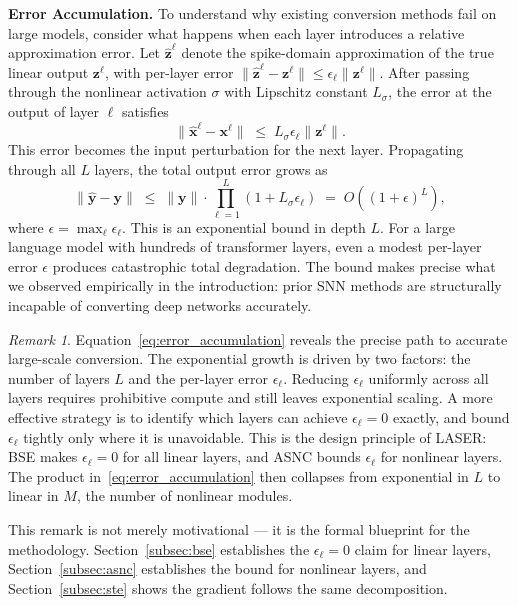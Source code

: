 \documentclass{article}
\theoremstyle{plain}
\theoremstyle{definition}
\theoremstyle{remark}
\newtheorem{remark}[theorem]{Remark}
\begin{document}
\noindent\textbf{Error Accumulation.}
\label{subsec:error_accumulation}
To understand why existing conversion methods fail on large models, consider what
happens when each layer introduces a relative approximation error. Let
$\hat{\mathbf{z}}^\ell$ denote the spike-domain approximation of the true linear
output $\mathbf{z}^\ell$, with per-layer error
$\|\hat{\mathbf{z}}^\ell - \mathbf{z}^\ell\| \le \epsilon_\ell
\|\mathbf{z}^\ell\|$.
After passing through the nonlinear activation $\sigma$ with Lipschitz constant
$L_\sigma$, the error at the output of layer $\ell$ satisfies
\[
\|\hat{\mathbf{x}}^\ell - \mathbf{x}^\ell\|
\;\le\; L_\sigma \epsilon_\ell \|\mathbf{z}^\ell\|.
\]
This error becomes the input perturbation for the next layer. Propagating through
all $L$ layers, the total output error grows as
\begin{equation}
\label{eq:error_accumulation}
\bigl\|\hat{\mathbf{y}} - \mathbf{y}\bigr\|
\;\le\; \|\mathbf{y}\| \cdot \prod_{\ell=1}^{L}(1 + L_\sigma \epsilon_\ell)
\;=\; O\!\left((1 + \epsilon)^L\right),
\end{equation}
where $\epsilon = \max_\ell \epsilon_\ell$. This is an exponential bound in depth
$L$. For a large language model with hundreds of transformer layers, even a modest
per-layer error $\epsilon$ produces catastrophic total degradation. The bound makes
precise what we observed empirically in the introduction: prior SNN methods are
structurally incapable of converting deep networks accurately.

\begin{remark}
\label{rem:error_structure}
Equation~\eqref{eq:error_accumulation} reveals the precise path to accurate
large-scale conversion. The exponential growth is driven by two factors: the number
of layers $L$ and the per-layer error $\epsilon_\ell$. Reducing $\epsilon_\ell$
uniformly across all layers requires prohibitive compute and still leaves exponential
scaling. A more effective strategy is to identify which layers can achieve
$\epsilon_\ell = 0$ exactly, and bound $\epsilon_\ell$ tightly only where it is
unavoidable. This is the design principle of LASER: BSE makes $\epsilon_\ell = 0$
for all linear layers, and ASNC bounds $\epsilon_\ell$ for nonlinear layers. The
product in~\eqref{eq:error_accumulation} then collapses from exponential in $L$
to linear in $M$, the number of nonlinear modules.
\end{remark}

This remark is not merely motivational — it is the formal blueprint for the
methodology. Section~\ref{subsec:bse} establishes the $\epsilon_\ell = 0$ claim for
linear layers, Section~\ref{subsec:asnc} establishes the bound for nonlinear layers,
and Section~\ref{subsec:ste} shows the gradient follows the same decomposition.
\end{document}

